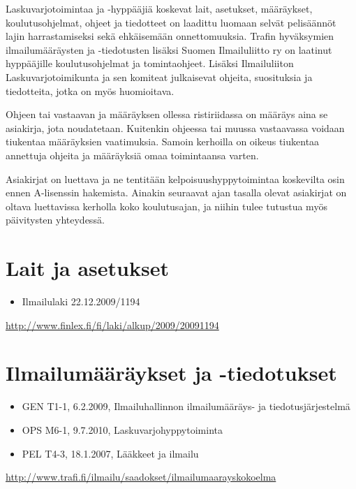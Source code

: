 
Laskuvarjotoimintaa ja -hyppääjiä koskevat lait, asetukset, määräykset, koulutusohjelmat, ohjeet ja tiedotteet on laadittu luomaan selvät pelisäännöt lajin harrastamiseksi sekä ehkäisemään onnettomuuksia. Trafin hyväksymien ilmailumääräysten ja -tiedotusten lisäksi Suomen Ilmailuliitto ry on laatinut hyppääjille koulutusohjelmat ja tomintaohjeet. Lisäksi Ilmailuliiton  Laskuvarjotoimikunta ja sen komiteat julkaisevat ohjeita, suosituksia ja tiedotteita, jotka on myös huomioitava. 


Ohjeen tai vastaavan ja määräyksen ollessa ristiriidassa on määräys aina se asiakirja, jota noudatetaan. Kuitenkin ohjeessa tai muussa vastaavassa voidaan tiukentaa määräyksien vaatimuksia. Samoin kerhoilla on oikeus tiukentaa annettuja ohjeita ja määräyksiä omaa toimintaansa varten. 


Asiakirjat on luettava ja ne tentitään kelpoisuushyppytoimintaa koskevilta osin ennen A-lisenssin hakemista. Ainakin seuraavat ajan tasalla olevat asiakirjat on oltava luettavissa kerholla koko koulutusajan, ja niihin tulee tutustua myös päivitysten yhteydessä. 

\section{ Lait ja asetukset }
\label{maaraykset-lait-ja-ohjeet-lait-ja-asetukset}

\begin{itemize}
\item  Ilmailulaki 22.12.2009/1194  
\end{itemize}

\url{http://www.finlex.fi/fi/laki/alkup/2009/20091194} 

\section{ Ilmailumääräykset ja -tiedotukset }
\label{maaraykset-lait-ja-ohjeet-ilmailumaaraykset-ja-tiedotukset}

\begin{itemize}
\item  GEN T1-1, 6.2.2009, Ilmailuhallinnon ilmailumääräys- ja tiedotusjärjestelmä 
\item  OPS M6-1, 9.7.2010, Laskuvarjohyppytoiminta 
\item  PEL T4-3, 18.1.2007, Lääkkeet ja ilmailu 
\end{itemize}

\url{http://www.trafi.fi/ilmailu/saadokset/ilmailumaarayskokoelma} 

